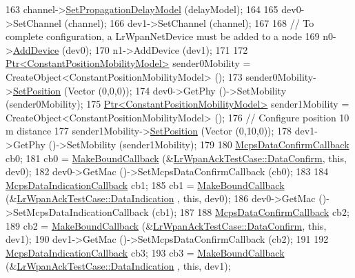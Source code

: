 \begin{DoxyCode}
163   channel->\hyperlink{classns3_1_1SingleModelSpectrumChannel_afd757c085623596ebf3da8264cfbaa45}{SetPropagationDelayModel} (delayModel);
164 
165   dev0->SetChannel (channel);
166   dev1->SetChannel (channel);
167 
168   \textcolor{comment}{// To complete configuration, a LrWpanNetDevice must be added to a node}
169   n0->\hyperlink{classns3_1_1Node_a42ff83ee1d5d1649c770d3f5b62375de}{AddDevice} (dev0);
170   n1->AddDevice (dev1);
171 
172   \hyperlink{classns3_1_1Ptr}{Ptr<ConstantPositionMobilityModel>} sender0Mobility = 
      CreateObject<ConstantPositionMobilityModel> ();
173   sender0Mobility->\hyperlink{classns3_1_1MobilityModel_ac584b3d5a309709d2f13ed6ada1e7640}{SetPosition} (Vector (0,0,0));
174   dev0->GetPhy ()->SetMobility (sender0Mobility);
175   \hyperlink{classns3_1_1Ptr}{Ptr<ConstantPositionMobilityModel>} sender1Mobility = 
      CreateObject<ConstantPositionMobilityModel> ();
176   \textcolor{comment}{// Configure position 10 m distance}
177   sender1Mobility->\hyperlink{classns3_1_1MobilityModel_ac584b3d5a309709d2f13ed6ada1e7640}{SetPosition} (Vector (0,10,0));
178   dev1->GetPhy ()->SetMobility (sender1Mobility);
179 
180   \hyperlink{classns3_1_1Callback}{McpsDataConfirmCallback} cb0;
181   cb0 = \hyperlink{group__makeboundcallback_ga1725d6362e6065faa0709f7c93f8d770}{MakeBoundCallback} (&\hyperlink{classLrWpanAckTestCase_a47e37262c04ab7ae2074a337516e34aa}{LrWpanAckTestCase::DataConfirm}, \textcolor{keyword}{
      this}, dev0);
182   dev0->GetMac ()->SetMcpsDataConfirmCallback (cb0);
183 
184   \hyperlink{classns3_1_1Callback}{McpsDataIndicationCallback} cb1;
185   cb1 = \hyperlink{group__makeboundcallback_ga1725d6362e6065faa0709f7c93f8d770}{MakeBoundCallback} (&\hyperlink{classLrWpanAckTestCase_a909c2c084312c564fbf2b8a4a2b1ec3b}{LrWpanAckTestCase::DataIndication}
      , \textcolor{keyword}{this}, dev0);
186   dev0->GetMac ()->SetMcpsDataIndicationCallback (cb1);
187 
188   \hyperlink{classns3_1_1Callback}{McpsDataConfirmCallback} cb2;
189   cb2 = \hyperlink{group__makeboundcallback_ga1725d6362e6065faa0709f7c93f8d770}{MakeBoundCallback} (&\hyperlink{classLrWpanAckTestCase_a47e37262c04ab7ae2074a337516e34aa}{LrWpanAckTestCase::DataConfirm}, \textcolor{keyword}{
      this}, dev1);
190   dev1->GetMac ()->SetMcpsDataConfirmCallback (cb2);
191 
192   \hyperlink{classns3_1_1Callback}{McpsDataIndicationCallback} cb3;
193   cb3 = \hyperlink{group__makeboundcallback_ga1725d6362e6065faa0709f7c93f8d770}{MakeBoundCallback} (&\hyperlink{classLrWpanAckTestCase_a909c2c084312c564fbf2b8a4a2b1ec3b}{LrWpanAckTestCase::DataIndication}
      , \textcolor{keyword}{this}, dev1);

\end{DoxyCode}
